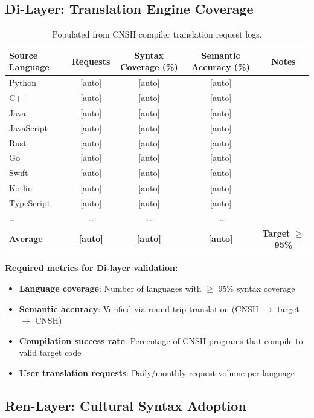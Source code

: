 \subsection{Di-Layer: Translation Engine Coverage}
\label{app:di-data}

\begin{table}[h]
\centering
\caption{Di-Layer Translation Coverage Log Template}
\renewcommand{\arraystretch}{1.3}
\begin{tabular}{lcccc}
\toprule
\textbf{Source Language} & \textbf{Requests} & \textbf{Syntax Coverage (\%)} & \textbf{Semantic Accuracy (\%)} & \textbf{Notes} \\
\midrule
Python & [auto] & [auto] & [auto] & \\
C++ & [auto] & [auto] & [auto] & \\
Java & [auto] & [auto] & [auto] & \\
JavaScript & [auto] & [auto] & [auto] & \\
Rust & [auto] & [auto] & [auto] & \\
Go & [auto] & [auto] & [auto] & \\
Swift & [auto] & [auto] & [auto] & \\
Kotlin & [auto] & [auto] & [auto] & \\
TypeScript & [auto] & [auto] & [auto] & \\
\ldots & \ldots & \ldots & \ldots & \\
\midrule
\textbf{Average} & \textbf{[auto]} & \textbf{[auto]} & \textbf{[auto]} & \textbf{Target $\geq$ 95\%} \\
\bottomrule
\end{tabular}
\caption*{Populated from CNSH compiler translation request logs.}
\end{table}

\noindent \textbf{Required metrics for Di-layer validation:}
\begin{itemize}
  \item \textbf{Language coverage}: Number of languages with $\geq$ 95\% syntax coverage
  \item \textbf{Semantic accuracy}: Verified via round-trip translation (CNSH $\to$ target $\to$ CNSH)
  \item \textbf{Compilation success rate}: Percentage of CNSH programs that compile to valid target code
  \item \textbf{User translation requests}: Daily/monthly request volume per language
\end{itemize}

\subsection{Ren-Layer: Cultural Syntax Adoption}
\label{app:ren-data}

